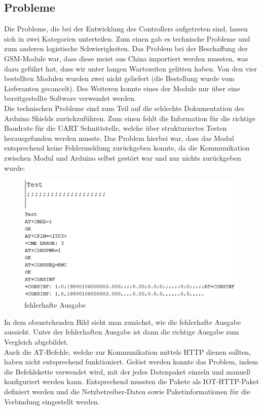 \subsection{Probleme}
Die Probleme, die bei der Entwicklung des Controllers aufgetreten sind, lassen sich in zwei Kategorien unterteilen. Zum einen gab es technische Probleme und zum anderen logistische Schwierigkeiten.
Das Problem bei der Beschaffung der GSM-Module war, dass diese meist aus China importiert werden mussten, was dazu geführt hat, dass wir unter langen Wartezeiten gelitten haben. Von den vier bestellten Modulen wurden zwei nicht geliefert (die Bestellung wurde vom Lieferanten gecancelt). Des Weiteren konnte eines der Module nur über eine bereitgestellte Software verwendet werden.
\\
Die technischen Probleme sind zum Teil auf die schlechte Dokumentation des Arduino Shields zurückzuführen. Zum einen fehlt die Information für die richtige Baudrate für die UART Schnittstelle, welche über strukturiertes Testen herausgefunden werden musste. Das Problem hierbei war, dass das Modul entsprechend keine Fehlermeldung zurückgeben konnte, da die Kommunikation zwischen Modul und Arduino selbst gestört war und nur nichts zurückgeben wurde:
\begin{figure} [H]
	\begin{center}
		\includegraphics[width=1\textwidth]{Bilder/Arduino_Probleme.png}
		\caption{fehlerhafte Ausgabe}
		\label{Arduinoproblem}
	\end{center}
\end{figure}
In dem obenstehenden Bild sieht man zunächst, wie die fehlerhafte Ausgabe aussieht. Unter der fehlerhaften Ausgabe ist dann die richtige Ausgabe zum Vergleich abgebildet.
\\
Auch die AT-Befehle, welche zur Kommunikation mittels HTTP dienen sollten, haben nicht entsprechend funktioniert. Gelöst werden konnte das Problem, indem die Befehlskette verwendet wird, mit der jedes Datenpaket einzeln und manuell konfiguriert werden kann. Entsprechend mussten die Pakete als IOT-HTTP-Paket definiert werden und die Netzbetreiber-Daten sowie Paketinformationen für die Verbindung eingestellt werden.
